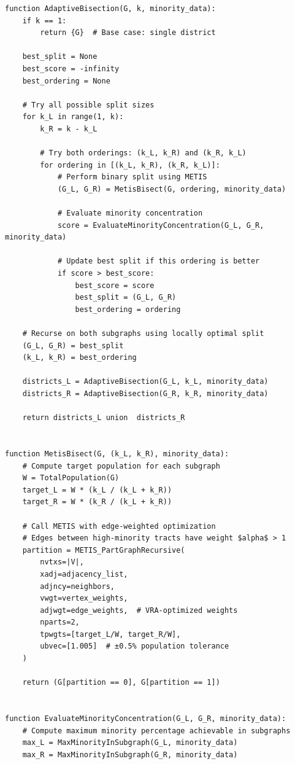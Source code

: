 \begin{verbatim}
function AdaptiveBisection(G, k, minority_data):
    if k == 1:
        return {G}  # Base case: single district

    best_split = None
    best_score = -infinity
    best_ordering = None

    # Try all possible split sizes
    for k_L in range(1, k):
        k_R = k - k_L

        # Try both orderings: (k_L, k_R) and (k_R, k_L)
        for ordering in [(k_L, k_R), (k_R, k_L)]:
            # Perform binary split using METIS
            (G_L, G_R) = MetisBisect(G, ordering, minority_data)

            # Evaluate minority concentration
            score = EvaluateMinorityConcentration(G_L, G_R, minority_data)

            # Update best split if this ordering is better
            if score > best_score:
                best_score = score
                best_split = (G_L, G_R)
                best_ordering = ordering

    # Recurse on both subgraphs using locally optimal split
    (G_L, G_R) = best_split
    (k_L, k_R) = best_ordering

    districts_L = AdaptiveBisection(G_L, k_L, minority_data)
    districts_R = AdaptiveBisection(G_R, k_R, minority_data)

    return districts_L union  districts_R


function MetisBisect(G, (k_L, k_R), minority_data):
    # Compute target population for each subgraph
    W = TotalPopulation(G)
    target_L = W * (k_L / (k_L + k_R))
    target_R = W * (k_R / (k_L + k_R))

    # Call METIS with edge-weighted optimization
    # Edges between high-minority tracts have weight $alpha$ > 1
    partition = METIS_PartGraphRecursive(
        nvtxs=|V|,
        xadj=adjacency_list,
        adjncy=neighbors,
        vwgt=vertex_weights,
        adjwgt=edge_weights,  # VRA-optimized weights
        nparts=2,
        tpwgts=[target_L/W, target_R/W],
        ubvec=[1.005]  # ±0.5% population tolerance
    )

    return (G[partition == 0], G[partition == 1])


function EvaluateMinorityConcentration(G_L, G_R, minority_data):
    # Compute maximum minority percentage achievable in subgraphs
    max_L = MaxMinorityInSubgraph(G_L, minority_data)
    max_R = MaxMinorityInSubgraph(G_R, minority_data)


\end{verbatim}
